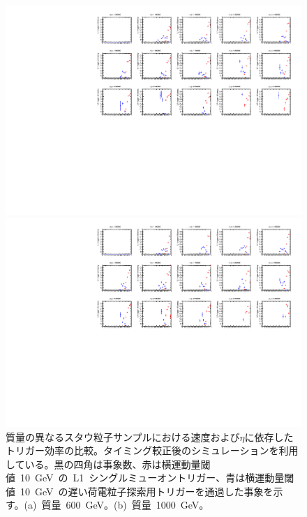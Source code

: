 \begin{figure}[H]
    \begin{minipage}{0.49\hsize}
    \centering   
    \includegraphics[width=\textwidth,page=16]{img/rec/stau_600.pdf}
    \subcaption{}
    \end{minipage}
    \begin{minipage}{0.49\hsize}
    \centering   
    \includegraphics[width=\textwidth,page=16]{img/rec/stau_1000.pdf}
    \subcaption{}
    \end{minipage}
    \caption[質量の異なるスタウ粒子サンプルにおける速度および$\eta$に依存したトリガー効率の比較]{質量の異なるスタウ粒子サンプルにおける速度および$\eta$に依存したトリガー効率の比較。タイミング較正後のシミュレーションを利用している。黒の四角は事象数、赤は横運動量閾値~10~GeV~の~L1~シングルミューオントリガー、青は横運動量閾値~10~GeV~の遅い荷電粒子探索用トリガーを通過した事象を示す。(a)~質量~600~GeV。(b)~質量~1000~GeV。}\label{fig:trietabeta6}
\end{figure}

